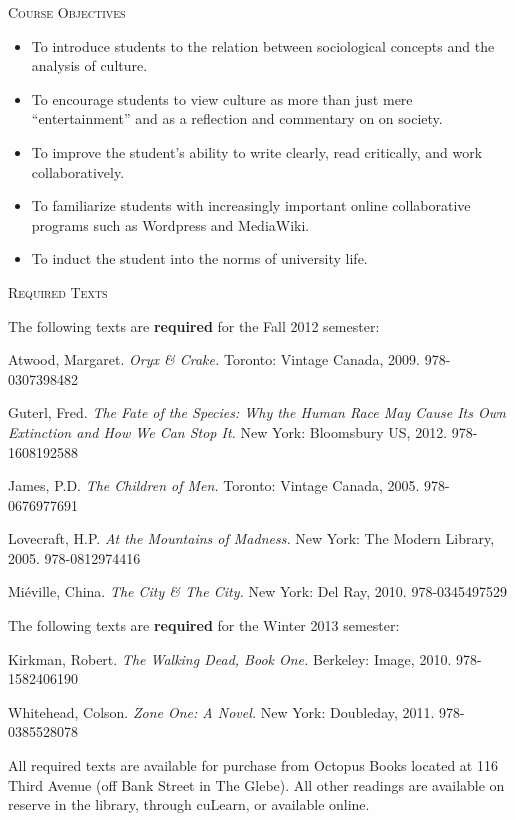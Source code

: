 \documentclass[12pt]{article}
\begin{document}
\vspace{.125in}

{\Large \textsc{Course Objectives}}

\begin{itemize}
\item To introduce students to the relation between sociological concepts and the analysis of culture.
\item To encourage students to view culture as more than just mere ``entertainment'' and as a reflection and commentary on on society.
\item To improve the student's ability to write clearly, read critically, and work collaboratively.
\item To familiarize students with increasingly important online collaborative programs such as Wordpress and MediaWiki.
\item To induct the student into the norms of university life.
\end{itemize}

{\Large \textsc{Required Texts}}

The following texts are \textbf{required} for the Fall 2012 semester:

\begin{hangparas}{.5in}{1}
Atwood, Margaret. \textit{Oryx \& Crake.} Toronto: Vintage Canada, 2009. 978-0307398482

Guterl, Fred. \textit{The Fate of the Species: Why the Human Race May Cause Its Own Extinction and How We Can Stop It.} New York: Bloomsbury US, 2012. 978-1608192588

James, P.D. \textit{The Children of Men.} Toronto: Vintage Canada, 2005. 978-0676977691

Lovecraft, H.P. \textit{At the Mountains of Madness.} New York: The Modern Library, 2005. 978-0812974416

Mi\'eville, China. \textit{The City \& The City.} New York: Del Ray, 2010. 978-0345497529

The following texts are \textbf{required} for the Winter 2013 semester:

Kirkman, Robert. \textit{The Walking Dead, Book One.} Berkeley: Image, 2010. 978-1582406190

Whitehead, Colson. \textit{Zone One: A Novel.} New York: Doubleday, 2011. 978-0385528078

\end{hangparas}

All required texts are available for purchase from Octopus Books located at 116 Third Avenue (off Bank Street in The Glebe). All other readings are available on reserve in the library, through cuLearn, or available online.
\end{document}
